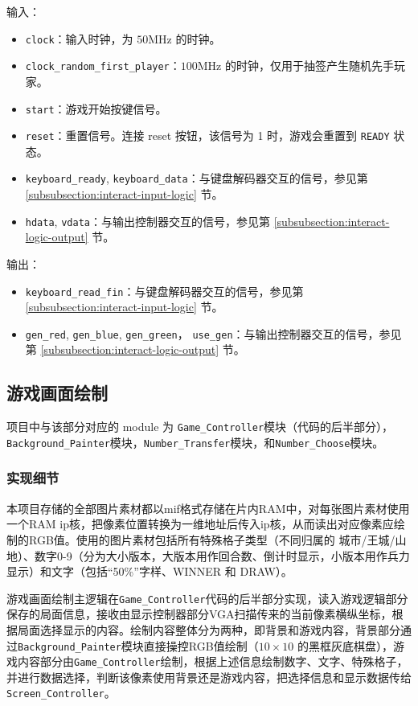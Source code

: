 输入：
\begin{itemize}
    \item \texttt{clock}：输入时钟，为 $50 \text{MHz}$ 的时钟。
    \item \texttt{clock\_random\_first\_player}：$100 \text{MHz}$ 的时钟，仅用于抽签产生随机先手玩家。
    \item \texttt{start}：游戏开始按键信号。
    \item \texttt{reset}：重置信号。连接 reset 按钮，该信号为 1 时，游戏会重置到 \texttt{READY} 状态。
    \item \texttt{keyboard\_ready}, \texttt{keyboard\_data}：与键盘解码器交互的信号，参见第 \ref{subsubsection:interact-input-logic} 节。
    \item \texttt{hdata}, \texttt{vdata}：与输出控制器交互的信号，参见第 \ref{subsubsection:interact-logic-output} 节。
\end{itemize}

输出：
\begin{itemize}
    \item \texttt{keyboard\_read\_fin}：与键盘解码器交互的信号，参见第 \ref{subsubsection:interact-input-logic} 节。
    \item \texttt{gen\_red}, \texttt{gen\_blue}, \texttt{gen\_green}， \texttt{use\_gen}：与输出控制器交互的信号，参见第 \ref{subsubsection:interact-logic-output} 节。
\end{itemize}


\subsection{游戏画面绘制}
项目中与该部分对应的 module 为 \texttt{Game\_Controller}模块（代码的后半部分），\texttt{Background\_Painter}模块，\texttt{Number\_Transfer}模块，和\texttt{Number\_Choose}模块。

\subsubsection{实现细节}
本项目存储的全部图片素材都以mif格式存储在片内RAM中，对每张图片素材使用一个RAM ip核，把像素位置转换为一维地址后传入ip核，从而读出对应像素应绘制的RGB值。使用的图片素材包括所有特殊格子类型（不同归属的 城市/王城/山地）、数字0-9（分为大小版本，大版本用作回合数、倒计时显示，小版本用作兵力显示）和文字（包括“50\%”字样、WINNER 和 DRAW）。

游戏画面绘制主逻辑在\texttt{Game\_Controller}代码的后半部分实现，读入游戏逻辑部分保存的局面信息，接收由显示控制器部分VGA扫描传来的当前像素横纵坐标，根据局面选择显示的内容。绘制内容整体分为两种，即背景和游戏内容，背景部分通过\texttt{Background\_Painter}模块直接操控RGB值绘制（$10\times 10$ 的黑框灰底棋盘），游戏内容部分由\texttt{Game\_Controller}绘制，根据上述信息绘制数字、文字、特殊格子，并进行数据选择，判断该像素使用背景还是游戏内容，把选择信息和显示数据传给 \texttt{Screen\_Controller}。

